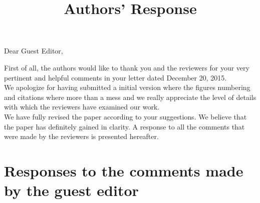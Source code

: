 \documentclass[12pt,a4paper]{article}
\title{Authors' Response}
\author{}
\date{}
\begin{document}
\begin{flushleft}
Dear Guest Editor,
\end{flushleft}

First of all, the authors would like to thank you and the reviewers for your very pertinent and helpful comments in your letter dated December 20, 2015.\\
We apologize for having submitted a initial version where the figures numbering and citations where more than a mess and we really appreciate the level of details with which the reviewers have examined our work.\\
We have fully revised the paper according to your suggestions. We believe that the paper has definitely gained in clarity. A response to all the comments that were made by the reviewers is presented hereafter.


\section{Responses to the comments made by the guest editor}
\end{document}
